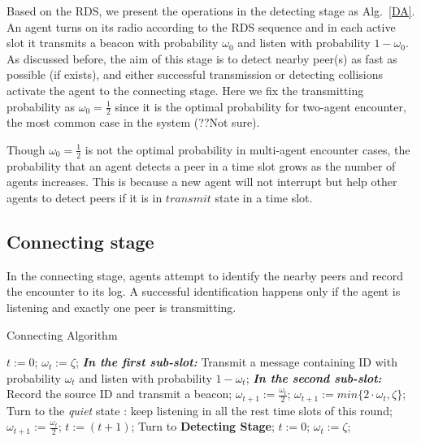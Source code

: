 Based on the RDS, we present the operations in the detecting stage as Alg.~\ref{DA}.
An agent turns on its radio according to the RDS sequence and in each active slot it
transmits a beacon with probability $\omega_0$ and listen with probability $1-\omega_0$.
As discussed before, the aim of this stage is to detect nearby peer(s) as fast as possible 
(if exists), and either successful transmission or detecting collisions activate the agent
to the connecting stage. Here we fix the transmitting probability as $\omega_0 = \frac{1}{2}$ 
since it is the optimal probability for two-agent encounter, the most common case
in the {\sysname} system (??Not sure). 
\begin{remark}
    Though $\omega_0 = \frac{1}{2}$ is not the optimal probability in multi-agent encounter cases, 
    the probability that an agent detects a peer in a time slot grows as the number of agents
    increases. This is because a new agent will not interrupt but help other agents to detect peers
    if it is in $transmit$ state in a time slot.
\end{remark}

\subsection{Connecting stage}

In the connecting stage, agents attempt to identify the nearby 
peers and record the encounter to its log.
A successful identification happens only if the agent is listening
and exactly one peer is transmitting. 

\begin{algorithm}[ht]
    \caption{Connecting Algorithm}
    \label{CA}
    \begin{algorithmic}[1]
    \STATE $t := 0$; $\omega_t := \zeta$; 
        \STATE \textbf{\emph{In the first sub-slot:}}
        \STATE Transmit a message containing ID with probability $\omega_t$
        and listen with probability $1-\omega_t$;
        \STATE \textbf{\emph{In the second sub-slot:}}
                \STATE Record the source ID and transmit a beacon;
                \STATE $\omega_{t+1} := \frac{\omega_t}{2}$;
                \STATE $\omega_{t+1} := min\{2\cdot\omega_t, \zeta\}$;
            \ENDIF
        \ELSE
                \STATE Turn to the \emph{quiet} state : keep listening in all 
                the rest time slots of this round;
            \ELSE
                \STATE $\omega_{t+1} := \frac{\omega_t}{2}$;
            \ENDIF
        \ENDIF
        \STATE $t := (t + 1)$;
                \STATE Turn to \textbf{Detecting Stage};
            \ELSE
                \STATE $t := 0$; $\omega_t := \zeta$;
            \ENDIF
        \ENDIF
    \ENDWHILE
    \end{algorithmic}
\end{algorithm}



